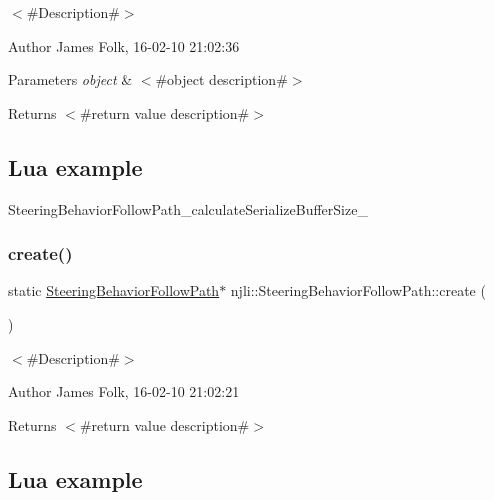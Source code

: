 $<$\#\+Description\#$>$ 

\begin{DoxyAuthor}{Author}
James Folk, 16-\/02-\/10 21\+:02\+:36
\end{DoxyAuthor}

\begin{DoxyParams}{Parameters}
{\em object} & $<$\#object description\#$>$\\
\hline
\end{DoxyParams}
\begin{DoxyReturn}{Returns}
$<$\#return value description\#$>$
\end{DoxyReturn}
\hypertarget{classnjli_1_1_steering_behavior_wander_ex1}{}\subsection{Lua example}\label{classnjli_1_1_steering_behavior_wander_ex1}

\begin{DoxyCodeInclude}
\end{DoxyCodeInclude}
Steering\+Behavior\+Follow\+Path\+\_\+calculate\+Serialize\+Buffer\+Size\+\_\+ \mbox{\label{classnjli_1_1_steering_behavior_follow_path_a28a4e4320e7fe35dd1f5b8142884617b}} 
\subsubsection{\texorpdfstring{create()}{create()}\hspace{0.1cm}{\footnotesize\ttfamily [1/2]}}
{\footnotesize\ttfamily static \mbox{\hyperlink{classnjli_1_1_steering_behavior_follow_path}{Steering\+Behavior\+Follow\+Path}}$\ast$ njli\+::\+Steering\+Behavior\+Follow\+Path\+::create (\begin{DoxyParamCaption}{ }\end{DoxyParamCaption})\hspace{0.3cm}{\ttfamily [static]}}



$<$\#\+Description\#$>$ 

\begin{DoxyAuthor}{Author}
James Folk, 16-\/02-\/10 21\+:02\+:21
\end{DoxyAuthor}
\begin{DoxyReturn}{Returns}
$<$\#return value description\#$>$
\end{DoxyReturn}
\hypertarget{classnjli_1_1_steering_behavior_wander_ex1}{}\subsection{Lua example}\label{classnjli_1_1_steering_behavior_wander_ex1}

